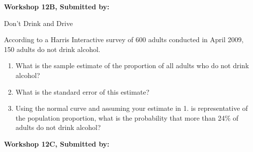 \documentclass[11pt, chapterprefix=true]{scrbook}\usepackage[]{graphicx}\usepackage[]{color}
\begin{document}
\begin{exercises}
    \begin{exercise}  %

    \begin{center}
\begin{flushleft}\textbf{\large \hfill Workshop 12B, Submitted by: }\end{flushleft}

\end{center}

Don't Drink and Drive

According to a Harris Interactive survey of 600 adults conducted in April 2009, 150 adults do not drink alcohol. 

\begin{enumerate}
  \item What is the sample estimate of the proportion of all adults who do not drink alcohol?
  \item What is the standard error of this estimate?
  \item Using the normal curve and assuming your estimate in 1. is representative of the population proportion, what is the probability that more than 24\% of adults do not drink alcohol?
\end{enumerate}

\end{exercise} 
\begin{solution}  %

\end{solution}

\clearpage

    \begin{exercise}  %

    \begin{center}
\begin{flushleft}\textbf{\large \hfill Workshop 12C, Submitted by: }\end{flushleft}


\end{center}
\end{exercise}
\end{exercises}
\end{document}
